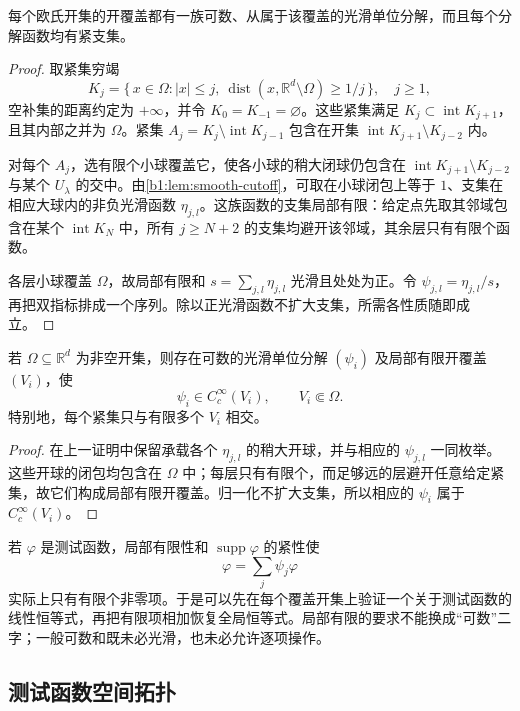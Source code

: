 \begin{theorem}\label{b1:thm:smooth-partition-unity}
每个欧氏开集的开覆盖都有一族可数、从属于该覆盖的光滑单位分解，而且每个分解函数均有紧支集。
\end{theorem}
\begin{proof}
取紧集穷竭
\[
 K_j=\{\,x\in\Omega:|x|\leq j,\ \operatorname{dist}(x,\mathbb R^d\setminus\Omega)\geq1/j\,\},
 \quad j\geq1,
\]
空补集的距离约定为 \(+\infty\)，并令 \(K_0=K_{-1}=\varnothing\)。这些紧集满足 \(K_j\subset\operatorname{int}K_{j+1}\)，且其内部之并为 \(\Omega\)。紧集
\(A_j=K_j\setminus\operatorname{int}K_{j-1}\) 包含在开集 \(\operatorname{int}K_{j+1}\setminus K_{j-2}\) 内。

对每个 \(A_j\)，选有限个小球覆盖它，使各小球的稍大闭球仍包含在 \(\operatorname{int}K_{j+1}\setminus K_{j-2}\) 与某个 \(U_\lambda\) 的交中。由\cref{b1:lem:smooth-cutoff}，可取在小球闭包上等于 \(1\)、支集在相应大球内的非负光滑函数 \(\eta_{j,l}\)。这族函数的支集局部有限：给定点先取其邻域包含在某个 \(\operatorname{int}K_N\) 中，所有 \(j\geq N+2\) 的支集均避开该邻域，其余层只有有限个函数。

各层小球覆盖 \(\Omega\)，故局部有限和 \(s=\sum_{j,l}\eta_{j,l}\) 光滑且处处为正。令 \(\psi_{j,l}=\eta_{j,l}/s\)，再把双指标排成一个序列。除以正光滑函数不扩大支集，所需各性质随即成立。
\end{proof}

\begin{corollary}\label{b1:cor:precompact-smooth-partition}
若 \(\Omega\subseteq\mathbb R^d\) 为非空开集，则存在可数的光滑单位分解 \((\psi_i)\) 及局部有限开覆盖 \((V_i)\)，使
\[
 \psi_i\in C_c^\infty(V_i),\qquad V_i\Subset\Omega.
\]
特别地，每个紧集只与有限多个 \(V_i\) 相交。
\end{corollary}
\begin{proof}
在上一证明中保留承载各个 \(\eta_{j,l}\) 的稍大开球，并与相应的 \(\psi_{j,l}\) 一同枚举。这些开球的闭包均包含在 \(\Omega\) 中；每层只有有限个，而足够远的层避开任意给定紧集，故它们构成局部有限开覆盖。归一化不扩大支集，所以相应的 \(\psi_i\) 属于 \(C_c^\infty(V_i)\)。
\end{proof}

若 \(\varphi\) 是测试函数，局部有限性和 \(\operatorname{supp}\varphi\) 的紧性使
\[
 \varphi=\sum_j\psi_j\varphi
\]
实际上只有有限个非零项。于是可以先在每个覆盖开集上验证一个关于测试函数的线性恒等式，再把有限项相加恢复全局恒等式。局部有限的要求不能换成“可数”二字；一般可数和既未必光滑，也未必允许逐项操作。

\subsection{测试函数空间拓扑}
\label{b1:subsec:200104}

